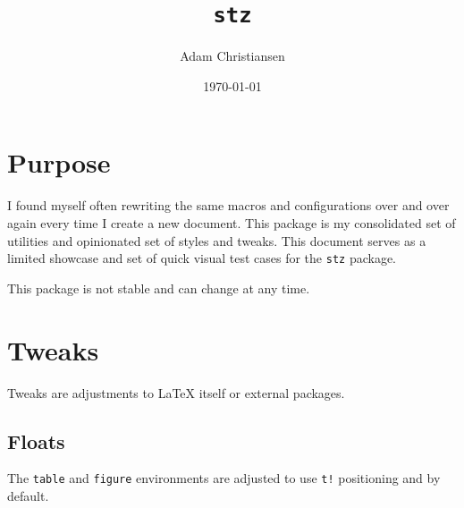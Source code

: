 \documentclass[11pt,titlepage]{article}
\title{\texttt{stz}}
\author{Adam Christiansen}
\date{\today}
\newcommand*{\code}[1]{\texttt{#1}}
\begin{document}
\maketitle
\tableofcontents
\clearpage


\section{Purpose}

I found myself often rewriting the same macros and configurations
over and over again every time I create a new document.
This package is my consolidated set of utilities
and opinionated set of styles and tweaks.
This document serves as a limited showcase
and set of quick visual test cases for the \code{stz} package.

\begin{caution}
  This package is not stable and can change at any time.
\end{caution}


\section{Tweaks}

Tweaks are adjustments to LaTeX itself or external packages.


\subsection{Floats}

The \code{table} and \code{figure} environments are adjusted to use
\code{t!} positioning and \code{\string\centering} by default.

\end{document}
